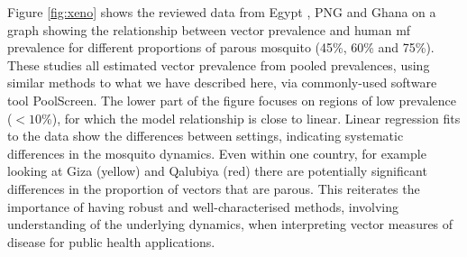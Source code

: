 Figure \ref{fig:xeno} shows the reviewed data from Egypt \cite{Farid2007,Ramzy2006}, PNG \cite{Reimer2013_insecticidal,Weil2008} and Ghana \cite{Owusu2015} on a graph showing the relationship between vector prevalence and human mf prevalence for different proportions of parous mosquito (45\%, 60\% and 75\%). These studies all estimated vector prevalence from pooled prevalences, using similar methods to what we have described here, via commonly-used software tool PoolScreen. The lower part of the figure focuses on regions of low prevalence ($<10$\%), for which the model relationship is close to linear. Linear regression fits to the data show the differences between settings, indicating systematic differences in the mosquito dynamics. Even within one country, for example looking at Giza (yellow) and Qalubiya (red) there are potentially significant differences in the proportion of vectors that are parous. This reiterates the importance of having robust and well-characterised methods, involving understanding of the underlying dynamics, when interpreting vector measures of disease for public health applications.


